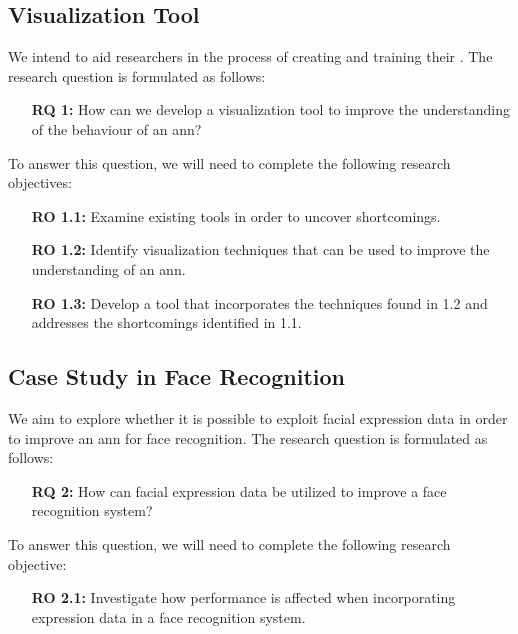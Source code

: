 \subsection{Visualization Tool}

We intend to aid researchers in the process of creating and training their . The research question is formulated as follows:

\begin{enumerate}[align=left, labelwidth=3.5em, leftmargin=!, itemindent=0em]
    \item[\textbf{RQ 1:}]How can we develop a visualization tool to improve the understanding of the behaviour of an \acrlong{ann}?
\end{enumerate}

\noindent To answer this question, we will need to complete the following research objectives:

\begin{enumerate}[align=left, labelwidth=3.5em, leftmargin=!, itemindent=0em]
    \item[\textbf{RO 1.1:}] Examine existing tools in order to uncover shortcomings.
    \item[\textbf{RO 1.2:}] Identify visualization techniques that can be used to improve the understanding of an \acrlong{ann}.
    \item[\textbf{RO 1.3:}]Develop a tool that incorporates the techniques found in 1.2 and addresses the shortcomings identified in 1.1.
\end{enumerate}

\subsection{Case Study in Face Recognition}

We aim to explore whether it is possible to exploit facial expression data in order to improve an \acrshort{ann} for face recognition. The research question is formulated as follows:

\begin{enumerate}[align=left, labelwidth=3.5em, leftmargin=!, itemindent=0em]
    \item[\textbf{RQ 2:}]How can facial expression data be utilized to improve a face recognition system?
\end{enumerate}

\noindent To answer this question, we will need to complete the following research objective:

\begin{enumerate}[align=left, labelwidth=3.5em, leftmargin=!, itemindent=0em]
    \item[\textbf{RO 2.1:}]Investigate how performance is affected when incorporating expression data in a face recognition system.
\end{enumerate}

